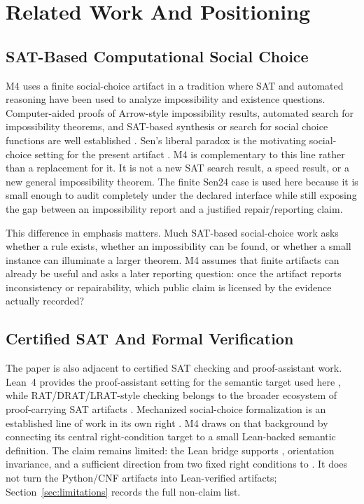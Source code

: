 \section{Related Work And Positioning}

\subsection*{SAT-Based Computational Social Choice}

M4 uses a finite social-choice artifact in a tradition where SAT and automated
reasoning have been used to analyze impossibility and existence questions.
Computer-aided proofs of Arrow-style impossibility results, automated search
for impossibility theorems, and SAT-based synthesis or search for social
choice functions are well established \citep{tanglin2009computer,
geist2011automated,brandtgeist2016strategyproof}. Sen's liberal paradox is
the motivating social-choice setting for the present artifact
\citep{sen1970}. M4 is complementary to this line rather than a replacement
for it. It is not a new SAT search result, a speed result, or a new general
impossibility theorem. The finite Sen24 case is used here because it is small
enough to audit completely under the declared interface while still exposing
the gap between an impossibility report and a justified repair/reporting
claim.

This difference in emphasis matters. Much SAT-based social-choice work asks
whether a rule exists, whether an impossibility can be found, or whether a
small instance can illuminate a larger theorem. M4 assumes that finite
artifacts can already be useful and asks a later reporting question: once the
artifact reports inconsistency or repairability, which public claim is
licensed by the evidence actually recorded?

\subsection*{Certified SAT And Formal Verification}

The paper is also adjacent to certified SAT checking and proof-assistant work.
Lean~4 provides the proof-assistant setting for the semantic target used here
\citep{moura2021lean4}, while RAT/DRAT/LRAT-style checking belongs to the
broader ecosystem of proof-carrying SAT artifacts \citep{cruzfilipe2017lrat,
wetzler2014drat}. Mechanized social-choice formalization is an established
line of work in its own right \citep{nipkow2009social}. M4 draws on that
background by connecting its central right-condition target to a small
Lean-backed semantic definition. The claim remains limited: the Lean bridge
supports , orientation invariance, and a sufficient
direction from two fixed right conditions to . It does not turn
the Python/CNF artifacts into Lean-verified artifacts; Section~\ref{sec:limitations}
records the full non-claim list.


